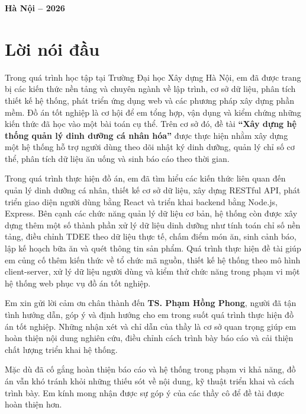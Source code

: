 \documentclass[12pt, a4paper]{report}
\begin{document}
\begin{titlepage}
\begin{center}
        \vfill
        
        {\fontsize{14pt}{16.8pt}\selectfont \textbf{Hà Nội -- 2026}}\\[1cm]
    \end{center}
    
    \restoregeometry
\end{titlepage}

\clearpage
{}

\chapter*{Lời nói đầu}


Trong quá trình học tập tại Trường Đại học Xây dựng Hà Nội, em đã được trang bị các kiến thức nền tảng và chuyên ngành về lập trình, cơ sở dữ liệu, phân tích thiết kế hệ thống, phát triển ứng dụng web và các phương pháp xây dựng phần mềm. Đồ án tốt nghiệp là cơ hội để em tổng hợp, vận dụng và kiểm chứng những kiến thức đã học vào một bài toán cụ thể. Trên cơ sở đó, đề tài \textbf{“Xây dựng hệ thống quản lý dinh dưỡng cá nhân hóa”} được thực hiện nhằm xây dựng một hệ thống hỗ trợ người dùng theo dõi nhật ký dinh dưỡng, quản lý chỉ số cơ thể, phân tích dữ liệu ăn uống và sinh báo cáo theo thời gian.

Trong quá trình thực hiện đồ án, em đã tìm hiểu các kiến thức liên quan đến quản lý dinh dưỡng cá nhân, thiết kế cơ sở dữ liệu, xây dựng RESTful API, phát triển giao diện người dùng bằng React và triển khai backend bằng Node.js, Express. Bên cạnh các chức năng quản lý dữ liệu cơ bản, hệ thống còn được xây dựng thêm một số thành phần xử lý dữ liệu dinh dưỡng như tính toán chỉ số nền tảng, điều chỉnh TDEE theo dữ liệu thực tế, chấm điểm món ăn, sinh cảnh báo, lập kế hoạch bữa ăn và quét thông tin sản phẩm. Quá trình thực hiện đề tài giúp em củng cố thêm kiến thức về tổ chức mã nguồn, thiết kế hệ thống theo mô hình client-server, xử lý dữ liệu người dùng và kiểm thử chức năng trong phạm vi một hệ thống web phục vụ đồ án tốt nghiệp.

Em xin gửi lời cảm ơn chân thành đến \textbf{TS. Phạm Hồng Phong}, người đã tận tình hướng dẫn, góp ý và định hướng cho em trong suốt quá trình thực hiện đồ án tốt nghiệp. Những nhận xét và chỉ dẫn của thầy là cơ sở quan trọng giúp em hoàn thiện nội dung nghiên cứu, điều chỉnh cách trình bày báo cáo và cải thiện chất lượng triển khai hệ thống.

Mặc dù đã cố gắng hoàn thiện báo cáo và hệ thống trong phạm vi khả năng, đồ án vẫn khó tránh khỏi những thiếu sót về nội dung, kỹ thuật triển khai và cách trình bày. Em kính mong nhận được sự góp ý của các thầy cô để đề tài được hoàn thiện hơn.
\end{document}
